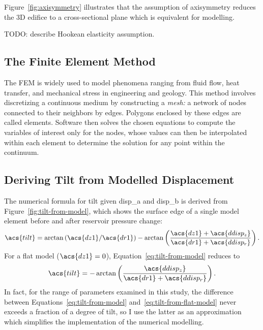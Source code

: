 Figure~\ref{fig:axisymmetry} illustrates that the assumption of axisymmetry reduces the 3D edifice to a cross-sectional plane which is equivalent for modelling.

TODO: describe Hookean elasticity assumption.

\subsection{The Finite Element Method}

The \ac{FEM} is widely used to model phenomena ranging from fluid flow, heat transfer, and mechanical stress in engineering and geology. This method involves discretizing a continuous medium by constructing a \emph{mesh:} a network of nodes connected to their neighbors by edges. Polygons enclosed by these edges are called elements. Software then solves the chosen equations to compute the variables of interest only for the nodes, whose values can then be interpolated within each element to determine the solution for any point within the continuum.

\subsection{Deriving Tilt from Modelled Displacement}

The numerical formula for \acf{tilt} given \acs{disp_a} and \acs{disp_b} is derived from Figure~\ref{fig:tilt-from-model}, which shows the surface edge of a single model element before and after reservoir pressure change:
\begin{equation}
    \acs{tilt} = \arctan\left({\acs{dz1}}/{\acs{dr1}}\right) - \arctan\left(\dfrac{\acs{dz1}+\acs{ddisp_z}}{\acs{dr1}+\acs{ddisp_r}}\right).\label{eq:tilt-from-model}
\end{equation}
For a flat model ($\acs{dz1} = 0$), Equation~\eqref{eq:tilt-from-model} reduces to
\begin{equation}
    \acs{tilt} = 
    -\arctan\left(\dfrac{\acs{ddisp_z}}{\acs{dr1}+\acs{ddisp_r}}\right).\label{eq:tilt-from-flat-model}
\end{equation}
In fact, for the range of parameters examined in this study, the difference between Equations~\eqref{eq:tilt-from-model} and~\eqref{eq:tilt-from-flat-model} never exceeds a fraction of a degree of tilt, so I use the latter as an approximation which simplifies the implementation of the numerical modelling.

